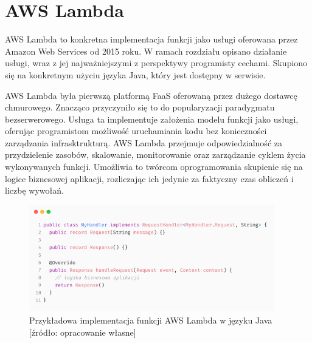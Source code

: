 \section{AWS Lambda}\label{chapter:aws_lambda}

AWS Lambda to konkretna implementacja funkcji jako usługi oferowana przez Amazon Web Services od 2015 roku.
W ramach rozdziału opisano działanie usługi, wraz z jej najważniejszymi z perspektywy programisty cechami.
Skupiono się na konkretnym użyciu języka Java, który jest dostępny w serwisie.

AWS Lambda była pierwszą platformą FaaS oferowaną przez dużego dostawcę chmurowego.
Znacząco przyczyniło się to do popularyzacji paradygmatu bezserwerowego.
Usługa ta implementuje założenia modelu funkcji jako usługi, oferując programistom możliwość uruchamiania kodu bez konieczności zarządzania infrasktrukturą.
AWS Lambda przejmuje odpowiedzialność za przydzielenie zasobów, skalowanie, monitorowanie oraz zarządzanie cyklem życia wykonywanych funkcji.
Umożliwia to twórcom oprogramowania skupienie się na logice biznesowej aplikacji, rozliczając ich jedynie za faktyczny czas obliczeń i liczbę wywołań.

\begin{figure}[h]
    \centering
    \includegraphics[width=0.95\textwidth]{charts/sample-lambda-code.png}
    \caption{Przykładowa implementacja funkcji AWS Lambda w języku Java [źródło: opracowanie własne]}
    \label{fig:example_aws_lambda}
\end{figure}

    


